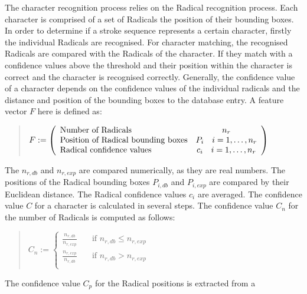 The character recognition process relies on the Radical recognition process.
Each character is comprised of a set of Radicals the position of their 
bounding boxes.
In order to determine if a stroke sequence represents a certain character,
firstly the individual Radicals are recognised. For character matching,
the recognised Radicals are compared with the Radicals of the character.
If they match with a confidence values above the threshold and their position 
within the character is correct and the character is recognised correctly.
Generally, the confidence value of a character depends on the confidence values
of the individual radicals and the distance and position of the bounding boxes
to the database entry. A feature vector \(F \) here is defined as:
\begin{quote}
\(
    F :=
    \left( 
    \begin {array} {l c} 
        \text{Number of Radicals} & n_{r} \\
        \text{Position of Radical bounding boxes} & 
                                   P_i \quad i = 1, \ldots, n_{r} \\
        \text{Radical confidence values} & c_{i} \quad i = 1, \ldots, n_{r} \\
    \end {array} 
    \right)
\)
\end{quote}
The \(n_{r,db} \) and \(n_{r,exp} \) are compared numerically, as they are real 
numbers. The positions of the Radical bounding boxes \(P_{i,db} \) and 
\(P_{i,exp} \) are compared by their Euclidean distance.
The Radical confidence values \(c_i\) are averaged.
The confidence value \(C\) for a character is calculated in several steps.
The confidence value \(C_n\) for the number of Radicals is computed as follows:
\begin{quote}
\(
   C_n := 
   \begin{cases}
     \frac{n_{r,db}}{n_{r,exp}} & \quad \text{if } n_{r,db} \leq n_{r,exp} \\
     \frac{n_{r,exp}}{n_{r,db}} & \quad \text{if } n_{r,db} > n_{r,exp} \\
   \end{cases}
\)
\end{quote}
The confidence value \(C_p\) for the Radical positions is extracted from a 
